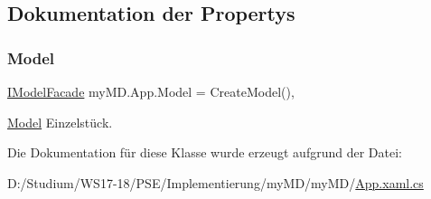 \subsection{Dokumentation der Propertys}
\mbox{\label{classmy_m_d_1_1_app_ab2df3a78e1379092a4298dc2c50e95bc}} 
\subsubsection{\texorpdfstring{Model}{Model}}
{\footnotesize\ttfamily \mbox{\hyperlink{interfacemy_m_d_1_1_model_interface_1_1_model_facade_interface_1_1_i_model_facade}{I\+Model\+Facade}} my\+M\+D.\+App.\+Model = Create\+Model()\hspace{0.3cm}{\ttfamily [static]}, {\ttfamily [get]}}



\mbox{\hyperlink{namespacemy_m_d_1_1_model}{Model}} Einzelstück. 



Die Dokumentation für diese Klasse wurde erzeugt aufgrund der Datei\+:\begin{DoxyCompactItemize}
\item 
D\+:/\+Studium/\+W\+S17-\/18/\+P\+S\+E/\+Implementierung/my\+M\+D/my\+M\+D/\mbox{\hyperlink{_app_8xaml_8cs}{App.\+xaml.\+cs}}\end{DoxyCompactItemize}
